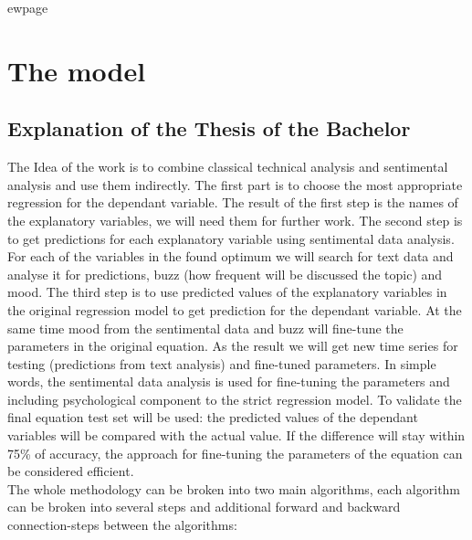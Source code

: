 \documentclass {article}
\begin{document}
 ewpage
\section{The model}
\subsection{Explanation of the Thesis of the Bachelor}
The Idea of the work is to combine classical technical analysis and sentimental analysis and use them indirectly. The first part is to choose the most appropriate regression for the dependant variable. The result of the first step is the names of the explanatory variables, we will need them for further work. The second step is to get predictions for each explanatory variable using sentimental data analysis. For each of the variables in the found optimum we will search for text data and analyse it for predictions, buzz (how frequent will be discussed the topic) and mood. The third step is to use predicted values of the explanatory variables in the original regression model to get prediction for the dependant variable. At the same time mood from the sentimental data and buzz will fine-tune the parameters in the original equation. As the result we will get new time series for testing (predictions from text analysis) and fine-tuned parameters. In simple words, the sentimental data analysis is used for fine-tuning the parameters and including psychological component to the strict regression model. To validate the final equation test set will be used: the predicted values of the dependant variables will be compared with the actual value. If the difference will stay within 75\% of accuracy, the approach for fine-tuning the parameters of the equation can be considered efficient.\\
The whole methodology can be broken into two main algorithms, each algorithm can be broken into several steps and additional forward and backward connection-steps between the algorithms:
\end{document}

